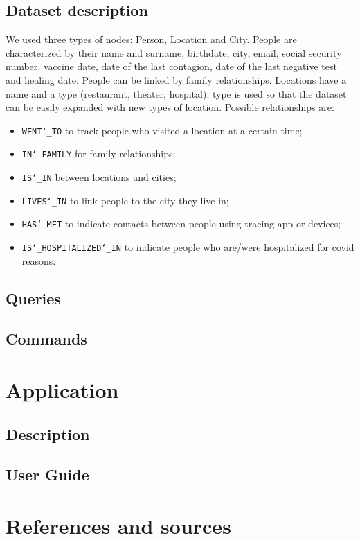 \documentclass[12pt, a4paper]{article}
\begin{document}
\blindtext

\subsection{Dataset description}

We used three types of nodes: Person, Location and City. 
People are characterized by their name and surname, birthdate, city, email, social security number, vaccine date, date of the last contagion, date of the last negative test and healing date. People can be linked by family relationships.
Locations have a name and a type (restaurant, theater, hospital); type is used so that the dataset can be easily expanded with new types of location.
Possible relationships are: 
\begin{itemize}
	\item \texttt{WENT\char`_TO} to track people who visited a location at a certain time;
	\item \texttt{IN\char`_FAMILY} for family relationships;
	\item \texttt{IS\char`_IN} between locations and cities;
	\item \texttt{LIVES\char`_IN} to link people to the city they live in;
	\item \texttt{HAS\char`_MET} to indicate contacts between people using tracing app or devices;
	\item \texttt{IS\char`_HOSPITALIZED\char`_IN} to indicate people who are/were hospitalized for covid reasons.
\end{itemize}

\subsection{Queries}

\blindtext

\subsection{Commands}

\blindtext

\clearpage

\section{Application}

\subsection{Description}

\blindtext

\subsection{User Guide}

\blindtext

\clearpage

\section{References and sources}

\blindtext

\clearpage
\end{document}

